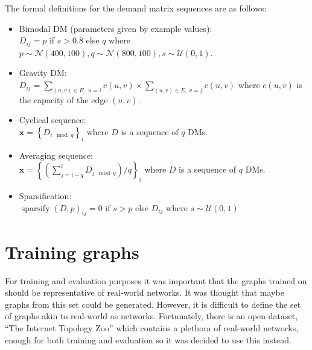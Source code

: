 The formal definitions for the demand matrix sequences are as follows:
\begin{itemize}
  \item Bimodal DM (parameters given by example values):\\
    $D_{ij} = p$ if $s > 0.8$ else $q$ where $p \sim \mathcal{N}(400, 100), q \sim \mathcal{N}(800, 100), s \sim \mathcal{U}(0,1)$.
  \item Gravity DM:\\
    $D_{ij} = \sum_{(u, v) \in E,\; u = i }{c(u,v)} \times \sum_{(u, v) \in E,\; v = j }{c(u, v)}$ where $c(u,v)$ is the capacity of the edge $(u,v)$.
  \item Cyclical sequence:\\
    $\bm{x} = \left\{ D_{i \mod q} \right\}_{i}$ where $D$ is a sequence of $q$ DMs.
  \item Averaging sequence:\\
    $\bm{x} = \left\{\left(\sum_{j=i-q}^{i}{D_{j \mod q}}\right) / q \right\}_{i}$ where $D$ is a sequence of $q$ DMs.
  \item Sparsification:\\
    $\operatorname{sparsify}(D, p)_{ij} = 0$ if $s > p$ else $D_{ij}$ where $s \sim \mathcal{U}(0,1)$
\end{itemize}

\section{Training graphs}
For training and evaluation purposes it was important that the graphs trained on should be representative of real-world networks. It was thought that maybe graphs from this set could be generated. However, it is difficult to define the set of graphs akin to real-world \ac{as} networks. Fortunately, there is an open dataset, ``The Internet Topology Zoo''\cite{6027859} which contains a plethora of real-world networks, enough for both training and evaluation so it was decided to use this instead.
